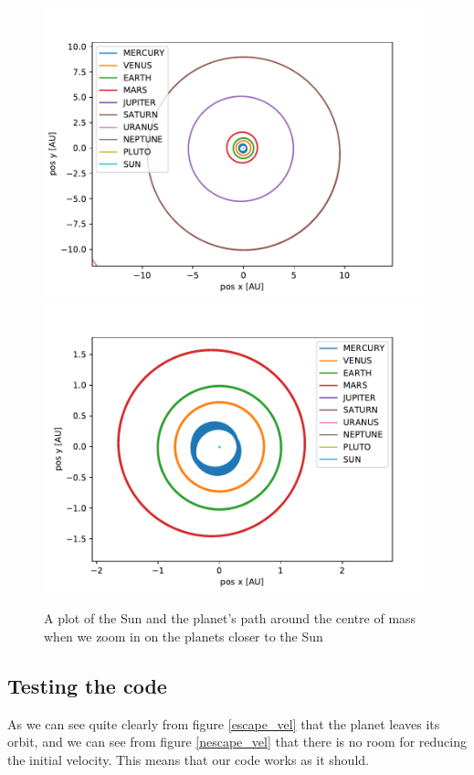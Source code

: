 \documentclass[a4paper]{article}
\begin{document}
	\begin{figure}[h!]
		\centering 
		\includegraphics[scale=0.56]{../opp_f2.pdf}
		\includegraphics[scale=0.56]{../opp_f3.pdf}
		\caption{A plot of the Sun and the planet's path around the centre of mass when we zoom in on the planets closer to the Sun}
		\label{f_1_1}
	\end{figure}
	\subsection{Testing the code}
	As we can see quite clearly from figure \ref{escape_vel} that the planet leaves its orbit, and we can see from figure \ref{nescape_vel} that there is no room for reducing the initial velocity. This means that our code works as it should.
	
\end{document}
